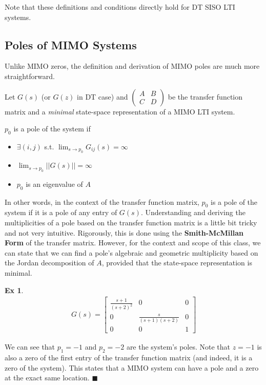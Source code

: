 \documentclass[twoside]{article}
\newtheorem{exmp}[theorem]{Ex}
\begin{document}
Note that these definitions and conditions directly hold for DT SISO LTI systems.

\newpage

\subsection{Poles of MIMO Systems}

Unlike MIMO zeros, the definition and derivation of MIMO poles are much more straightforward. 

Let $G(s)$ (or $G(z)$ in DT case) and $\left( \begin{array}{c|c} A & B \\ \hline C & D  \end{array} \right)$ be the transfer function matrix and a \textit{minimal} state-space representation of a MIMO LTI system.

$p_0$ is a pole of the system if 
%
\begin{itemize}
 \item $\exists (i,j)$ s.t. $\lim_{s \to p_0}G_{ij}(s) = \infty$
 \item $\lim_{s \to p_0} || G(s) || = \infty$
 \item $p_0$ is an eigenvalue of $A$
\end{itemize}
%
In other words, in the context of the transfer function matrix, $p_0$ is a pole of the system if it is a pole of any entry of $G(s)$. Understanding and deriving the multiplicities of a pole based on the transfer function matrix is a little bit tricky and not very intuitive. Rigorously, this is done using the \textbf{Smith-McMillan Form} of the transfer matrix. However, for the context and scope of this class, we can state that we can find a pole's algebraic and geometric multiplicity based on the Jordan decomposition of $A$, provided that the state-space representation is minimal. 
%
\begin{exmp}
	\begin{align*}
	G(s) = \begin{bmatrix} \frac{s+1}{(s+2)^2} & 0 & 0 \\  
	0 & \frac{s}{(s+1)(s+2)} & 0 \\ 0 & 0 & 1  \end{bmatrix}
	\end{align*}
\end{exmp}
%
We can see that $p_1 = -1$ and $p_2 = -2$ are the system's poles. Note that $z = -1$ is also a zero of the 
first entry of the transfer function matrix (and indeed, it is a zero of the system). This states that a MIMO system can have a pole and a zero at the exact same location. \hfill $\blacksquare$
\end{document}
